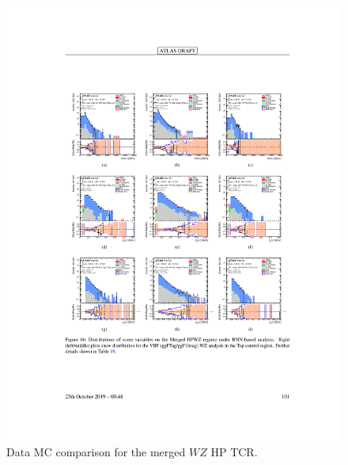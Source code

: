 \begin{figure}[h!]
  \centering
  \includegraphics[width=\hsize]{figures/Analysis/datamc/merged_hp_wz_tcr.pdf}
    \caption{Data MC comparison for the merged $WZ$ HP TCR.} 
  \label{fig:merged_hp_wz_TCR_datamc}
\end{figure} 
\FloatBarrier


